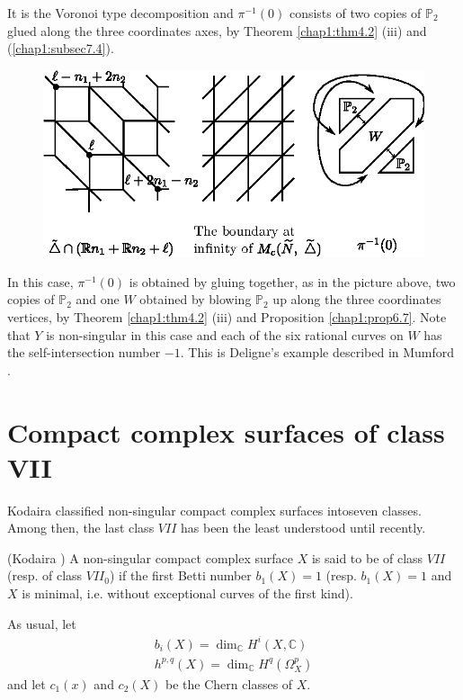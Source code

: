  It is the Voronoi type decomposition  and $\pi^{-1}(0)$ consists of
 two copies of $\mathbb{P}_2$ glued along the three coordinates axes,
 by Theorem \ref{chap1:thm4.2} (iii) and (\ref{chap1:subsec7.4}). 
 \begin{figure}[H]
\centering 
\includegraphics{vol58-fig/fig58-65.eps} 
\end{figure}\pageoriginale
 
 In this case, $\pi^{-1}(0)$ is obtained by gluing together, as in the
 picture above, two copies of $\mathbb{P}_2$ and one $W$ obtained by
 blowing $\mathbb{P}_2$ up along the three coordinates vertices,  by
 Theorem \ref{chap1:thm4.2} (iii) and Proposition
 \ref{chap1:prop6.7}. Note that $Y$ is 
 non-singular in this case and each of the six rational curves on $W$
 has the self-intersection number $-1$. This is Deligne's example
 described in Mumford \cite{keyM7}. 
 

 \section{Compact complex surfaces of class VII}\label{chap2:sec12} 
 
 Kodaira\pageoriginale \cite{keyK3} classified non-singular compact complex
 surfaces into\break seven classes. Among then, the last class $VII$ has
 been the least understood until recently.  

 \begin{defi*}
(Kodaira \cite[II, Thm 26]{keyK3}) A non-singular compact complex surface $X$
   is said to be of class $VII$ (resp. of class $VII_0$) if the first
   Betti number $b_1(X)=1$ (resp. $b_1(X) =1$ and $X$ is minimal,
   i.e. without exceptional curves of the first kind). 
 \end{defi*} 
 
 As usual, let
 \begin{gather*}
b_i(X) =\dim_{\mathbb{C}}H^i (X, \mathbb{C})\\
h^{p,q}(X) = \dim_{\mathbb{C}} H^q (\Omega^p_X)
 \end{gather*} 
 and let $c_1(x)$ and $c_2(X)$ be the Chern classes of $X$. 
 
